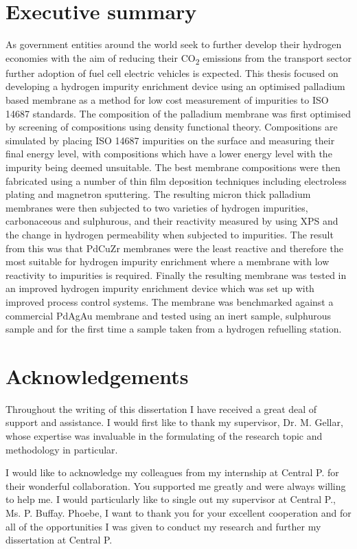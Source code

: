 \documentclass[a4paper,12pt]{report}
\begin{document}
\chapter*{Executive summary}
As government entities around the world seek to further develop their hydrogen economies with the aim of reducing their CO\textsubscript{2} emissions from the transport sector further adoption of fuel cell electric vehicles is expected. This thesis focused on developing a hydrogen impurity enrichment device using an optimised palladium based membrane as a method for low cost measurement of impurities to ISO 14687 standards. The composition of the palladium membrane was first optimised by screening of compositions using density functional theory. Compositions are simulated by placing ISO 14687 impurities on the surface and measuring their final energy level, with compositions which have a lower energy level with the impurity being deemed unsuitable. The best membrane compositions were then fabricated using a number of thin film deposition techniques including electroless plating and magnetron sputtering. The resulting micron thick palladium membranes were then subjected to two varieties of hydrogen impurities, carbonaceous and sulphurous, and their reactivity measured by using XPS and the change in hydrogen permeability when subjected to impurities. The result from this was that PdCuZr membranes were the least reactive and therefore the most suitable for hydrogen impurity enrichment where a membrane with low reactivity to impurities is required. Finally the resulting membrane was tested in an improved hydrogen impurity enrichment device which was set up with improved process control systems. The membrane was benchmarked against a commercial PdAgAu membrane and tested using an inert sample, sulphurous sample and for the first time a sample taken from a hydrogen refuelling station.


\chapter*{Acknowledgements}
Throughout the writing of this dissertation I have received a great deal of support and assistance. I  would  first  like  to  thank  my  supervisor,  Dr.  M.  Gellar,  whose  expertise  was  invaluable  in  the formulating of the research topic and methodology in particular.

I would like to acknowledge my colleagues from my internship at Central P. for their wonderful collaboration. You supported me greatly and were always willing to help me. I would particularly like to single out my supervisor at Central P., Ms. P. Buffay. Phoebe, I want to thank you for your excellent  cooperation  and  for  all  of  the  opportunities  I  was  given  to  conduct  my  research  and further my dissertation at Central P.
\end{document}
